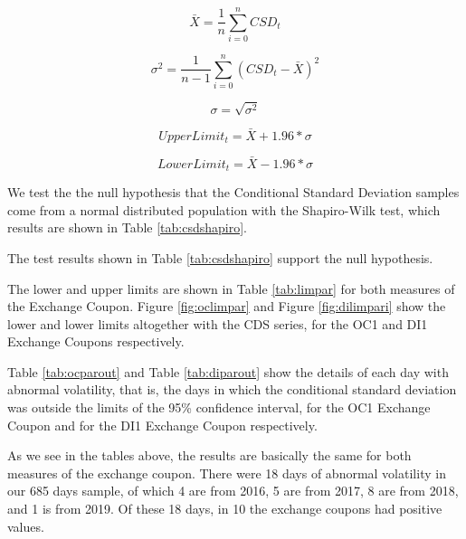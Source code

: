 \documentclass[a4paper]{article}
\begin{document}
$$\bar{X} = \frac{1}{n} \displaystyle\sum_{i=0}^{n} CSD_t$$

$$\sigma^2 = \frac{1}{n-1} \displaystyle\sum_{i=0}^{n} (CSD_t - \bar{X})^2$$

$$\sigma = \sqrt{\sigma^2}$$

\begin{equation}
\label{eqn:upp}
UpperLimit_t = \bar{X} + 1.96 * \sigma
\end{equation}

\begin{equation}
\label{eqn:lop}
LowerLimit_t = \bar{X} - 1.96 * \sigma
\end{equation}


We test the the null hypothesis that the Conditional Standard Deviation samples come from a normal distributed population with the Shapiro-Wilk test, which results are shown in Table \ref{tab:csdshapiro}.



The test results shown in Table \ref{tab:csdshapiro} support the null hypothesis.

The lower and upper limits are shown in Table \ref{tab:limpar} for both measures of the Exchange Coupon. Figure \ref{fig:oclimpar} and Figure \ref{fig:dilimpari} show the lower and lower limits altogether with the CDS series, for the OC1 and DI1 Exchange Coupons respectively.







Table \ref{tab:ocparout} and Table \ref{tab:diparout} show the details of each day with abnormal volatility, that is, the days in which the conditional standard deviation was outside the limits of the 95\% confidence interval, for the OC1 Exchange Coupon and for the DI1 Exchange Coupon respectively.






As we see in the tables above, the results are basically the same for both measures of the exchange coupon. There were 18 days of abnormal volatility in our 685 days sample, of which 4 are from 2016, 5 are from 2017, 8 are from 2018, and 1 is from 2019. Of these 18 days, in 10 the exchange coupons had positive values.
\end{document}
